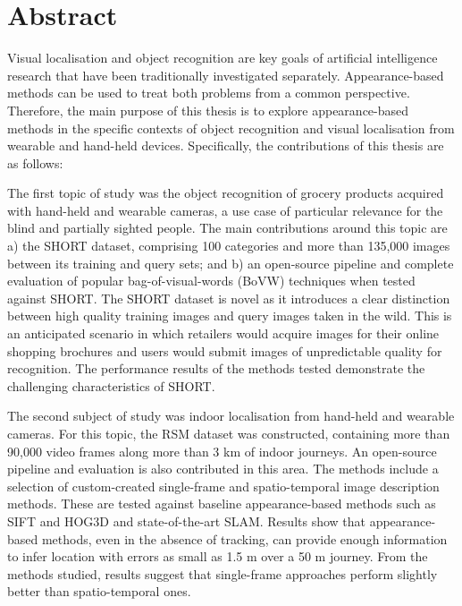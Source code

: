 \begingroup
\let\clearpage\relax
\let\cleardoublepage\relax
\let\cleardoublepage\relax

\chapter*{Abstract}

Visual localisation and object recognition are key goals of artificial intelligence research that have been traditionally investigated separately. Appearance-based methods can be used to treat both problems from a common perspective. Therefore, the main purpose of this thesis is to explore appearance-based methods in the specific contexts of object recognition and visual localisation from wearable and hand-held devices. Specifically, the contributions of this thesis are as follows:

The first topic of study was the object recognition of grocery products acquired with hand-held and wearable cameras, a use case of particular relevance for the blind and partially sighted people. The main contributions around this topic are a) the SHORT dataset, comprising 100 categories and more than 135,000 images between its training and query sets; and b) an open-source pipeline and complete evaluation of popular bag-of-visual-words (BoVW) techniques when tested against SHORT. The SHORT dataset is novel as it introduces a clear distinction between high quality training images and query images taken in the wild. This is an anticipated scenario in which retailers would acquire images for their online shopping brochures and users would submit images of unpredictable quality for recognition. The performance results of the methods tested demonstrate the challenging characteristics of SHORT.

The second subject of study was indoor localisation from hand-held and wearable cameras. For this topic, the RSM dataset was constructed, containing more than 90,000 video frames along more than 3 km of indoor journeys. An open-source pipeline and evaluation is also contributed in this area. The methods include a selection of custom-created single-frame and spatio-temporal image description methods. These are tested against baseline appearance-based methods such as SIFT and HOG3D and state-of-the-art SLAM. Results show that appearance-based methods, even in the absence of tracking, can provide enough information to infer location with errors as small as 1.5 m over a 50 m journey. From the methods studied, results suggest that single-frame approaches perform slightly better than spatio-temporal ones.

